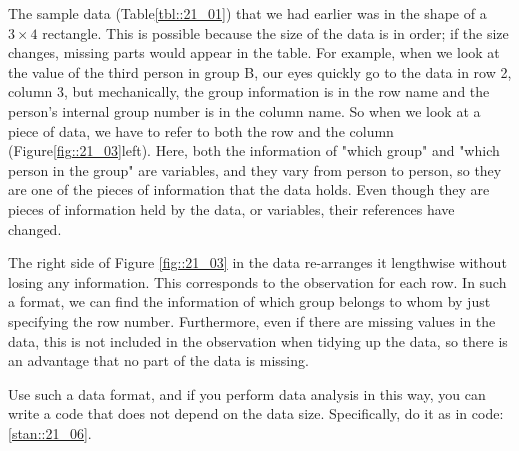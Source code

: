 \documentclass{ltjsbook}
\begin{document}
The sample data (Table\ref{tbl::21_01}) that we had earlier was in the shape of a $3\times4$ rectangle. This is possible because the size of the data is in order; if the size changes, missing parts would appear in the table.
For example, when we look at the value of the third person in group B, our eyes quickly go to the data in row 2, column 3, but mechanically, the group information is in the row name and the person's internal group number is in the column name. So when we look at a piece of data, we have to refer to both the row and the column (Figure\ref{fig::21_03}left). Here, both the information of "which group" and "which person in the group" are variables, and they vary from person to person, so they are one of the pieces of information that the data holds. Even though they are pieces of information held by the data, or variables, their references have changed.

The right side of Figure \ref{fig::21_03} in the data re-arranges it lengthwise without losing any information. This corresponds to the observation for each row. In such a format, we can find the information of which group belongs to whom by just specifying the row number. Furthermore, even if there are missing values in the data, this is not included in the observation when tidying up the data, so there is an advantage that no part of the data is missing.


Use such a data format, and if you perform data analysis in this way, you can write a code that does not depend on the data size. Specifically, do it as in code:\ref{stan::21_06}.

\end{document}
